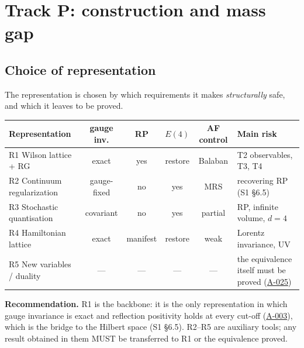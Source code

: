 \documentclass[11pt,a4paper]{article}
\newcommand{\idref}[1]{\hyperref[#1]{\textsf{#1}}}
\begin{document}
\section{Track P: construction and mass gap}\label{sec:positive}

\subsection{Choice of representation}
The representation is chosen by which requirements it makes \emph{structurally} safe, and which it leaves to be proved.

\begin{center}\small
\begin{tabularx}{\textwidth}{@{}p{3.8cm}ccccX@{}}
\toprule
Representation & gauge inv. & RP & $E(4)$ & AF control & Main risk\\
\midrule
R1 Wilson lattice + RG & exact & yes & restore & Balaban & T2 observables, T3, T4\\
R2 Continuum regularization & gauge-fixed & no & yes & MRS & recovering RP (S1 \S6.5)\\
R3 Stochastic quantisation & covariant & no & yes & partial & RP, infinite volume, $d=4$\\
R4 Hamiltonian lattice & exact & manifest & restore & weak & Lorentz invariance, UV\\
R5 New variables / duality & --- & --- & --- & --- & the equivalence itself must be proved (\idref{A-025})\\
\bottomrule
\end{tabularx}
\end{center}

\textbf{Recommendation.} R1 is the backbone: it is the only representation in which gauge invariance is exact and reflection positivity holds at every cut-off (\idref{A-003}), which is the bridge to the Hilbert space (S1 \S6.5). R2--R5 are auxiliary tools; any result obtained in them MUST be transferred to R1 or the equivalence proved.
\end{document}
